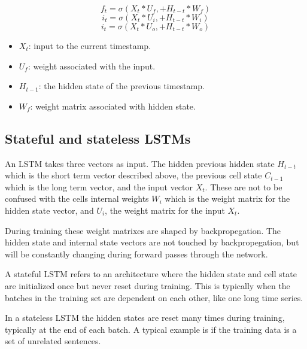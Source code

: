 \begin{equation}
  f_t = \sigma (X_t * U_f, + H_{t-t} * W_f)
  \label{eq:lstm:forget-gate}
\end{equation}
\begin{equation}
  i_t = \sigma (X_t * U_i, + H_{t-t} * W_i)
  \label{eq:lstm:input_gate}
\end{equation}
\begin{equation}
  i_t = \sigma (X_t * U_o, + H_{t-t} * W_o)
  \label{eq:lstm:output-gate}
\end{equation}
\begin{itemize}
  \item $X_t$: input to the current timestamp.
  \item $U_f$: weight associated with the input.
  \item $H_{t-1}$: the hidden state of the previous timestamp.
  \item $W_f$: weight matrix associated with hidden state.
\end{itemize}






\subsection*{Stateful and stateless LSTMs}
\label{section:BT:stateful-vs-stateless}
An LSTM takes three vectors as input. The hidden previous hidden state $H_{t-t}$
which is the short term vector described above, the previous cell state
$C_{t-1}$ which is the long term vector, and the input vector $X_t$.
These are not to be confused with the cells internal weights $W_i$
which is the weight matrix for the hidden state vector, and $U_i$,
the weight matrix for the input $X_t$.

During training these weight matrixes are shaped by backpropegation.
The hidden state and internal state vectors are not touched by backpropegation,
but will be constantly changing during forward passes through the network.

A stateful LSTM refers to an architecture where the hidden state and cell state
are initialized once but never reset during training. This is typically
when the batches in the training set are dependent on each other, like
one long time series.

In a stateless LSTM the hidden states are reset many times during training,
typically at the end of each batch. A typical example is if the training
data is a set of unrelated sentences.


